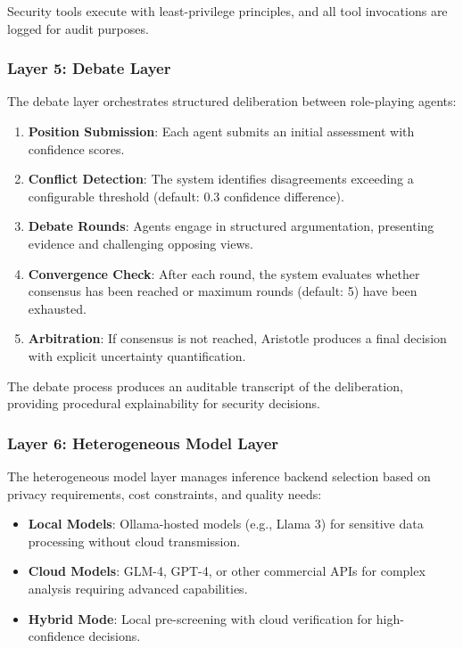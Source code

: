 Security tools execute with least-privilege principles, and all tool invocations are logged for audit purposes.

\subsubsection{Layer 5: Debate Layer}
\label{subsubsec:layer5}

The debate layer orchestrates structured deliberation between role-playing agents:

\begin{enumerate}
    \item \textbf{Position Submission}: Each agent submits an initial assessment with confidence scores.
    \item \textbf{Conflict Detection}: The system identifies disagreements exceeding a configurable threshold (default: 0.3 confidence difference).
    \item \textbf{Debate Rounds}: Agents engage in structured argumentation, presenting evidence and challenging opposing views.
    \item \textbf{Convergence Check}: After each round, the system evaluates whether consensus has been reached or maximum rounds (default: 5) have been exhausted.
    \item \textbf{Arbitration}: If consensus is not reached, Aristotle produces a final decision with explicit uncertainty quantification.
\end{enumerate}

The debate process produces an auditable transcript of the deliberation, providing procedural explainability for security decisions.

\subsubsection{Layer 6: Heterogeneous Model Layer}
\label{subsubsec:layer6}

The heterogeneous model layer manages inference backend selection based on privacy requirements, cost constraints, and quality needs:

\begin{itemize}
    \item \textbf{Local Models}: Ollama-hosted models (e.g., Llama 3) for sensitive data processing without cloud transmission.
    \item \textbf{Cloud Models}: GLM-4, GPT-4, or other commercial APIs for complex analysis requiring advanced capabilities.
    \item \textbf{Hybrid Mode}: Local pre-screening with cloud verification for high-confidence decisions.
\end{itemize}

